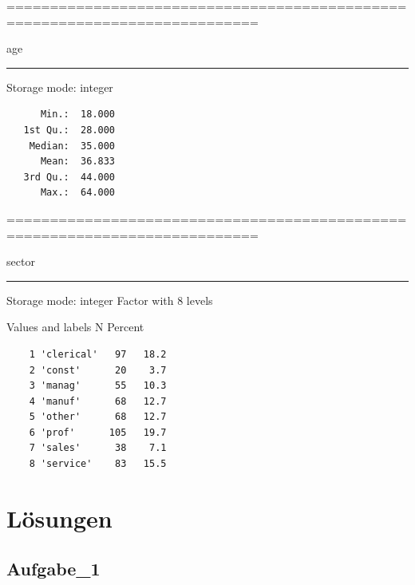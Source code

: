 \documentclass[]{article}
\begin{document}
===========================================================================

age

\begin{center}\rule{0.5\linewidth}{\linethickness}\end{center}

Storage mode: integer

\begin{verbatim}
      Min.:  18.000
   1st Qu.:  28.000
    Median:  35.000
      Mean:  36.833
   3rd Qu.:  44.000
      Max.:  64.000
\end{verbatim}

===========================================================================

sector

\begin{center}\rule{0.5\linewidth}{\linethickness}\end{center}

Storage mode: integer Factor with 8 levels

Values and labels N Percent

\begin{verbatim}
    1 'clerical'   97   18.2     
    2 'const'      20    3.7     
    3 'manag'      55   10.3     
    4 'manuf'      68   12.7     
    5 'other'      68   12.7     
    6 'prof'      105   19.7     
    7 'sales'      38    7.1     
    8 'service'    83   15.5     
\end{verbatim}

\section*{Lösungen}\label{losungen}

\hypertarget{aufgabe_1}{\subsection*{Aufgabe\_1}\label{aufgabe_1}}
\end{document}

